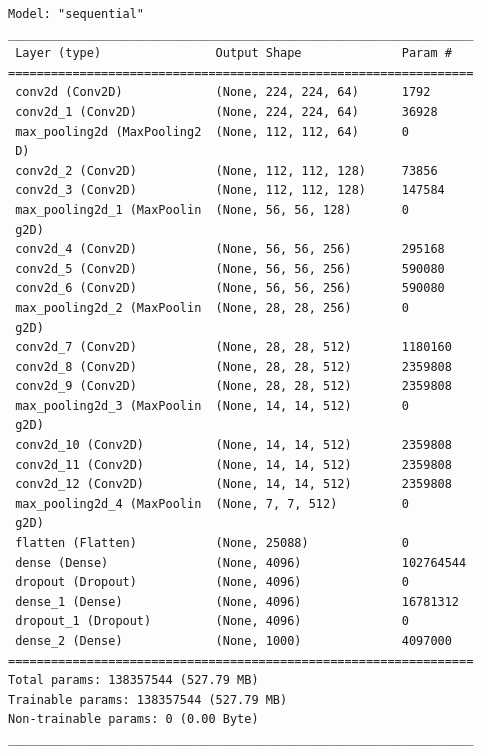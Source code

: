 \begin{lstlisting}[numbers=none]
Model: "sequential"
_________________________________________________________________
 Layer (type)                Output Shape              Param #   
=================================================================
 conv2d (Conv2D)             (None, 224, 224, 64)      1792      
 conv2d_1 (Conv2D)           (None, 224, 224, 64)      36928     
 max_pooling2d (MaxPooling2  (None, 112, 112, 64)      0         
 D)                                                              
 conv2d_2 (Conv2D)           (None, 112, 112, 128)     73856     
 conv2d_3 (Conv2D)           (None, 112, 112, 128)     147584    
 max_pooling2d_1 (MaxPoolin  (None, 56, 56, 128)       0         
 g2D)                                                            
 conv2d_4 (Conv2D)           (None, 56, 56, 256)       295168    
 conv2d_5 (Conv2D)           (None, 56, 56, 256)       590080    
 conv2d_6 (Conv2D)           (None, 56, 56, 256)       590080    
 max_pooling2d_2 (MaxPoolin  (None, 28, 28, 256)       0         
 g2D)                                                            
 conv2d_7 (Conv2D)           (None, 28, 28, 512)       1180160   
 conv2d_8 (Conv2D)           (None, 28, 28, 512)       2359808   
 conv2d_9 (Conv2D)           (None, 28, 28, 512)       2359808   
 max_pooling2d_3 (MaxPoolin  (None, 14, 14, 512)       0         
 g2D)                                                            
 conv2d_10 (Conv2D)          (None, 14, 14, 512)       2359808   
 conv2d_11 (Conv2D)          (None, 14, 14, 512)       2359808   
 conv2d_12 (Conv2D)          (None, 14, 14, 512)       2359808   
 max_pooling2d_4 (MaxPoolin  (None, 7, 7, 512)         0         
 g2D)
 flatten (Flatten)           (None, 25088)             0         
 dense (Dense)               (None, 4096)              102764544 
 dropout (Dropout)           (None, 4096)              0         
 dense_1 (Dense)             (None, 4096)              16781312  
 dropout_1 (Dropout)         (None, 4096)              0         
 dense_2 (Dense)             (None, 1000)              4097000   
=================================================================
Total params: 138357544 (527.79 MB)
Trainable params: 138357544 (527.79 MB)
Non-trainable params: 0 (0.00 Byte)
_________________________________________________________________
\end{lstlisting}


















































